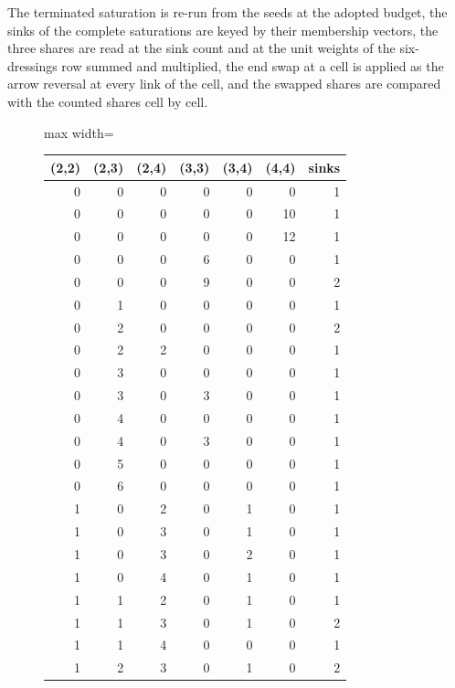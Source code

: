 The terminated saturation is re-run from the seeds at the adopted budget, the sinks of the complete saturations are keyed by their membership vectors, the three shares are read at the sink count and at the unit weights of the six-dressings row summed and multiplied, the end swap at a cell is applied as the arrow reversal at every link of the cell, and the swapped shares are compared with the counted shares cell by cell.
\begin{figure}[htbp]\centering
\footnotesize
\setlength{\tabcolsep}{4pt}
\begin{adjustbox}{max width=\linewidth}\begin{tabular}{|rrrrrr|r|}
\hline
\textbf{(2,2)} & \textbf{(2,3)} & \textbf{(2,4)} & \textbf{(3,3)} & \textbf{(3,4)} & \textbf{(4,4)} & \textbf{sinks} \\ \hline
0 & 0 & 0 & 0 & 0 & 0 & 1 \\
0 & 0 & 0 & 0 & 0 & 10 & 1 \\
0 & 0 & 0 & 0 & 0 & 12 & 1 \\
0 & 0 & 0 & 6 & 0 & 0 & 1 \\
0 & 0 & 0 & 9 & 0 & 0 & 2 \\
0 & 1 & 0 & 0 & 0 & 0 & 1 \\
0 & 2 & 0 & 0 & 0 & 0 & 2 \\
0 & 2 & 2 & 0 & 0 & 0 & 1 \\
0 & 3 & 0 & 0 & 0 & 0 & 1 \\
0 & 3 & 0 & 3 & 0 & 0 & 1 \\
0 & 4 & 0 & 0 & 0 & 0 & 1 \\
0 & 4 & 0 & 3 & 0 & 0 & 1 \\
0 & 5 & 0 & 0 & 0 & 0 & 1 \\
0 & 6 & 0 & 0 & 0 & 0 & 1 \\
1 & 0 & 2 & 0 & 1 & 0 & 1 \\
1 & 0 & 3 & 0 & 1 & 0 & 1 \\
1 & 0 & 3 & 0 & 2 & 0 & 1 \\
1 & 0 & 4 & 0 & 1 & 0 & 1 \\
1 & 1 & 2 & 0 & 1 & 0 & 1 \\
1 & 1 & 3 & 0 & 1 & 0 & 2 \\
1 & 1 & 4 & 0 & 0 & 0 & 1 \\
1 & 2 & 3 & 0 & 1 & 0 & 2 \\

\end{tabular}
\end{adjustbox}
\end{figure}

